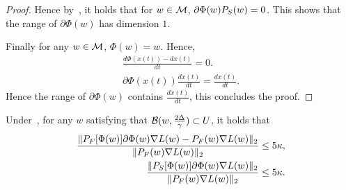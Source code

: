 \begin{proof}
Hence by~, it holds that for $w \in \mathcal{M}$, $ \partial \Phi(w) {P}_S(w) = 0$. This shows that the range of $\partial \Phi(w)$ has dimension $1$.

Finally for any $w \in \mathcal{M}$, $\Phi(w) = w$. Hence,
\begin{align*}
    \frac{d \Phi(x (t)) - d x(t)}{dt} = 0. \\
    \partial \Phi(x(t)) \frac{d x(t)}{dt} = \frac{dx(t)}{dt}.
\end{align*}
Hence the range of $\partial \Phi(w)$ contains $ \frac{dx(t)}{dt}$, this concludes the proof.
\end{proof}


\begin{lemma}
\label{lem:boundpartialphi}
Under~, for any $w$ satisfying that $\mathcal{B}(w, \frac{2 \Delta}{\gamma}) \subset U$,  it holds that 
\begin{align*}
     \frac{\| {P}_F[\Phi(w)] \partial \Phi(w) \nabla L(w) -  {P}_F(w) \nabla L(w) \|_2}{ \| {P}_F(w) \nabla L(w)  \|_2} &\le 5\kappa,\\
     \frac{\| {P}_S[\Phi(w)] \partial \Phi(w) \nabla L(w) \|_2}{ \| {P}_F(w) \nabla L(w)  \|_2} &\le 5\kappa.
\end{align*}
\end{lemma}

